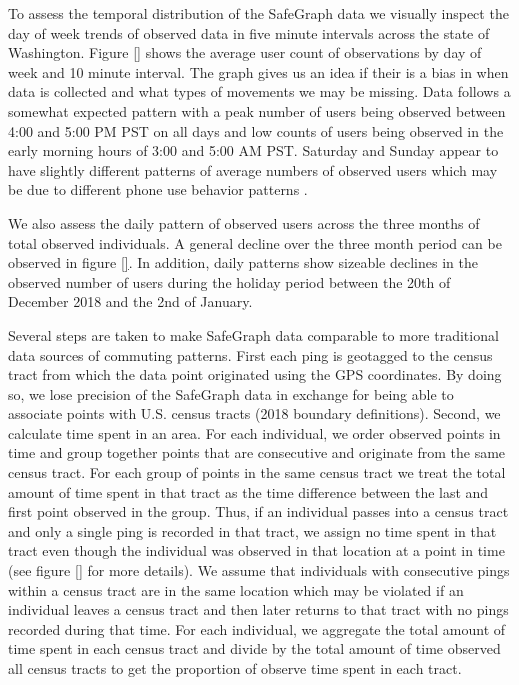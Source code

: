 \documentclass[fleqn,10pt]{olplainarticle}
\begin{document}
To assess the temporal distribution of the SafeGraph data we visually inspect the day of week trends of observed data in five minute intervals across the state of Washington. Figure \ref{} shows the average user count of observations by day of week and 10 minute interval. The graph gives us an idea if their is a bias in when data is collected and what types of movements we may be missing. Data follows a somewhat expected pattern with a peak number of users being observed between 4:00 and 5:00 PM PST on all days and low counts of users being observed in the early morning hours of 3:00 and 5:00 AM PST. Saturday and Sunday appear to have slightly different patterns of average numbers of observed users which may be due to different phone use behavior patterns \cite{}.

We also assess the daily pattern of observed users across the three months of total observed individuals. A general decline over the three month period can be observed in figure \ref{}. In addition, daily patterns show sizeable declines in the observed number of users during the holiday period between the 20th of December 2018 and the 2nd of January.

Several steps are taken to make SafeGraph data comparable to more traditional data sources of commuting patterns. First each ping is geotagged to the census tract from which the data point originated using the GPS coordinates. By doing so, we lose precision of the SafeGraph data in exchange for being able to associate points with U.S. census tracts (2018 boundary definitions). Second, we calculate time spent in an area. For each individual, we order observed points in time and group together points that are consecutive and originate from the same census tract. For each group of points in the same census tract we treat the total amount of time spent in that tract as the time difference between the last and first point observed in the group. Thus, if an individual passes into a census tract and only a single ping is recorded in that tract, we assign no time spent in that tract even though the individual was observed in that location at a point in time (see figure \ref{} for more details). We assume that individuals with consecutive pings within a census tract are in the same location which may be violated if an individual leaves a census tract and then later returns to that tract with no pings recorded during that time. For each individual, we aggregate the total amount of time spent in each census tract and divide by the total amount of time observed all census tracts to get the proportion of observe time spent in each tract.
\end{document}
